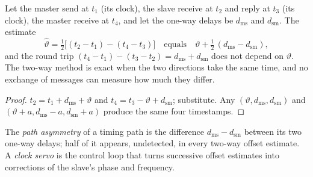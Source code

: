 \begin{omfigure}

\label{fig:nw:time-synchronisation:exchange}
\end{omfigure}

\begin{proposition}\label{prop:nw:time-synchronisation:offset}
Let the master send at $t_1$ (its clock), the slave receive at $t_2$ and reply at $t_3$ (its clock), the master receive at $t_4$,
and let the one-way delays be $d_{\mathrm{ms}}$ and $d_{\mathrm{sm}}$. The estimate
\[
  \hat\vartheta = \tfrac12\bigl[(t_2 - t_1) - (t_4 - t_3)\bigr]
  \quad\text{equals}\quad \vartheta + \tfrac12\,(d_{\mathrm{ms}} - d_{\mathrm{sm}}),
\]
and the round trip $(t_4 - t_1) - (t_3 - t_2) = d_{\mathrm{ms}} + d_{\mathrm{sm}}$ does not depend on $\vartheta$. The two-way method
is exact when the two directions take the same time, and no exchange of messages can measure how much they differ.
\end{proposition}

\begin{proof}
$t_2 = t_1 + d_{\mathrm{ms}} + \vartheta$ and $t_4 = t_3 - \vartheta + d_{\mathrm{sm}}$; substitute. Any $(\vartheta, d_{\mathrm{ms}},
d_{\mathrm{sm}})$ and $(\vartheta + a, d_{\mathrm{ms}} - a, d_{\mathrm{sm}} + a)$ produce the same four timestamps.
\end{proof}

\begin{definition}\label{def:nw:time-synchronisation:asym}
The \emph{path asymmetry} of a timing path is the difference $d_{\mathrm{ms}} - d_{\mathrm{sm}}$ between its
two one-way delays; half of it appears, undetected, in every two-way offset estimate. A \emph{clock servo} is the
control loop that turns successive offset estimates into corrections of the slave's phase and frequency.
\end{definition}

